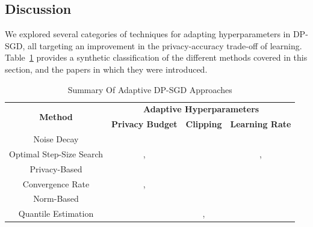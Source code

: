 \subsection{Discussion}
\label{AdapDisc}
We explored several categories of techniques for adapting hyperparameters in DP-SGD, all targeting an improvement in the privacy-accuracy trade-off of learning. Table~\ref{tab: adapTable} provides a synthetic classification of the different methods covered in this section, and  the papers in which they were introduced. 
\begin{table}[]\centering
\caption{Summary Of Adaptive DP-SGD Approaches}\label{tab: adapTable}
\begin{tabular}{|c|ccc|}
\hline
\multirow{2}{*}{\textbf{Method}} & \multicolumn{3}{c|}{\textbf{Adaptive Hyperparameters}}                                                         \\ \cline{2-4} 
                                  & \multicolumn{1}{c|}{\textbf{Privacy Budget}} & \multicolumn{1}{c|}{\textbf{Clipping}} & \textbf{Learning Rate} \\ \hline
Noise Decay                       & \multicolumn{1}{c|}{\cite{RefWorks:RefID:47-yu2019differentially}}                        & \multicolumn{1}{c|}{}                  &                        \\ \hline
Optimal Step-Size Search          & \multicolumn{1}{c|}{\cite{concentrated},\cite{chen2020stochastic}}                        & \multicolumn{1}{c|}{}                  &    \cite{concentrated},\cite{chen2020stochastic}                    \\ \hline
Privacy-Based                     & \multicolumn{1}{c|}{}                        & \multicolumn{1}{c|}{\cite{chen2020stochastic}}                  &                        \\ \hline
Convergence Rate                  & \multicolumn{1}{c|}{\cite{RefWorks:RefID:49-hong2022dynamic},\cite{RefWorks:RefID:48-fay2023adaptive}}                        & \multicolumn{1}{c|}{}                  &                        \\ \hline
Norm-Based                        & \multicolumn{1}{c|}{}                        & \multicolumn{1}{c|}{\cite{RefWorks:RefID:36-lennarttools}}                  &                        \\ \hline
Quantile Estimation               & \multicolumn{1}{c|}{}                        & \multicolumn{1}{c|}{\cite{RefWorks:RefID:39-he2022exploring},\cite{RefWorks:RefID:37-andrewdifferentially}}                  &                        \\ \hline

\end{tabular}
\end{table}

